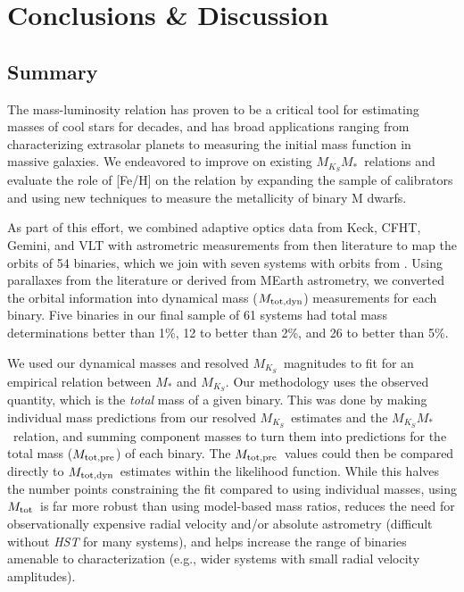 \documentclass[twocolumn]{aastex62}
\newcommand{\mks}{$M_{K_S}$}
\newcommand{\mmk}{$M_{K_S}$\textendash$M_*$}
\newcommand{\mtot}{$M_{\rm{tot}}$}
\newcommand{\mpred}{$M_{\rm{tot,pre}}$}
\newcommand{\mdyn}{$M_{\rm{tot,dyn}}$}
\begin{document}
\section{Conclusions \& Discussion}\label{sec:discussion} 

\subsection{Summary}
The mass-luminosity relation has proven to be a critical tool for estimating masses of cool stars for decades, and has broad applications ranging from characterizing extrasolar planets to measuring the initial mass function in massive galaxies. We endeavored to improve on existing \mmk\ relations and evaluate the role of [Fe/H] on the relation by expanding the sample of calibrators and using new techniques to measure the metallicity of binary M dwarfs. 

As part of this effort, we combined adaptive optics data from Keck, CFHT, Gemini, and VLT with astrometric measurements from then literature to map the orbits of 54 binaries, which we join with seven systems with orbits from \citet{Dupuy2017}. Using parallaxes from the literature or derived from MEarth astrometry, we converted the orbital information into dynamical mass (\mdyn) measurements for each binary. Five binaries in our final sample of 61 systems had total mass determinations better than 1\%, 12 to better than 2\%, and 26 to better than 5\%. 

We used our dynamical masses and resolved \mks\ magnitudes to fit for an empirical relation between $M_*$ and \mks. Our methodology uses the observed quantity, which is the {\it total} mass of a given binary. This was done by making individual mass predictions from our resolved \mks\ estimates and the \mmk\ relation, and summing component masses to turn them into predictions for the total mass (\mpred) of each binary. The \mpred\ values could then be compared directly to \mdyn\ estimates within the likelihood function. While this halves the number points constraining the fit compared to using individual masses, using \mtot\ is far more robust than using model-based mass ratios, reduces the need for observationally expensive radial velocity and/or absolute astrometry (difficult without {\it HST} for many systems), and helps increase the range of binaries amenable to characterization (e.g., wider systems with small radial velocity amplitudes). 
\end{document}
